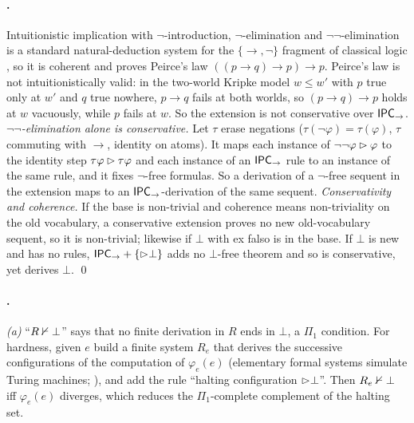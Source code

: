 \paragraph{.} Intuitionistic implication with $\neg$-introduction, $\neg$-elimination and $\neg\neg$-elimination is a standard natural-deduction system for the $\{\to,\neg\}$ fragment of classical logic \citep{prawitz1965natural}, so it is coherent and proves Peirce's law $((p\to q)\to p)\to p$. Peirce's law is not intuitionistically valid: in the two-world Kripke model $w\le w'$ with $p$ true only at $w'$ and $q$ true nowhere, $p\to q$ fails at both worlds, so $(p\to q)\to p$ holds at $w$ vacuously, while $p$ fails at $w$. So the extension is not conservative over $\mathsf{IPC}_\to$.
\emph{$\neg\neg$-elimination alone is conservative.} Let $\tau$ erase negations ($\tau(\neg\varphi)=\tau(\varphi)$, $\tau$ commuting with $\to$, identity on atoms). It maps each instance of $\neg\neg\varphi\rhd\varphi$ to the identity step $\tau\varphi\rhd\tau\varphi$ and each instance of an $\mathsf{IPC}_\to$ rule to an instance of the same rule, and it fixes $\neg$-free formulas. So a derivation of a $\neg$-free sequent in the extension maps to an $\mathsf{IPC}_\to$-derivation of the same sequent.
\emph{Conservativity and coherence.} If the base is non-trivial and coherence means non-triviality on the old vocabulary, a conservative extension proves no new old-vocabulary sequent, so it is non-trivial; likewise if $\bot$ with ex falso is in the base. If $\bot$ is new and has no rules, $\mathsf{IPC}_\to+\{\rhd\bot\}$ adds no $\bot$-free theorem and so is conservative, yet derives $\bot$. \qed

\paragraph{.} \emph{(a)} ``$R\nvdash\bot$'' says that no finite derivation in $R$ ends in $\bot$, a $\Pi_1$ condition. For hardness, given $e$ build a finite system $R_e$ that derives the successive configurations of the computation of $\varphi_e(e)$ (elementary formal systems simulate Turing machines; \citealt{post1943formal,smullyan1961theory}), and add the rule ``halting configuration $\rhd\bot$''. Then $R_e\nvdash\bot$ iff $\varphi_e(e)$ diverges, which reduces the $\Pi_1$-complete complement of the halting set.


